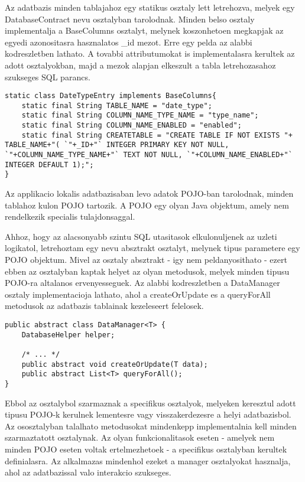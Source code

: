 Az adatbazis minden tablajahoz egy statikus osztaly lett letrehozva, melyek egy DatabaseContract nevu osztalyban tarolodnak.
Minden belso osztaly implementalja a BaseColumns osztalyt, melynek koszonhetoen megkapjak az egyedi azonositasra hasznalatos  \_id mezot.
Erre egy pelda az alabbi kodreszletben lathato.
A tovabbi attributumokat is implementalasra kerultek az adott osztalyokban, majd a mezok alapjan elkeszult a tabla letrehozasahoz szukseges SQL parancs.
\begin{lstlisting}
static class DateTypeEntry implements BaseColumns{
	static final String TABLE_NAME = "date_type";
	static final String COLUMN_NAME_TYPE_NAME = "type_name";
	static final String COLUMN_NAME_ENABLED = "enabled";
	static final String CREATETABLE = "CREATE TABLE IF NOT EXISTS "+ TABLE_NAME+"( `"+_ID+"` INTEGER PRIMARY KEY NOT NULL, `"+COLUMN_NAME_TYPE_NAME+"` TEXT NOT NULL, `"+COLUMN_NAME_ENABLED+"` INTEGER DEFAULT 1);";
}
\end{lstlisting}

Az applikacio lokalis adatbazisaban levo adatok POJO-ban tarolodnak, minden tablahoz kulon POJO tartozik.
A POJO egy olyan Java objektum, amely nem rendelkezik specialis tulajdonsaggal.

Ahhoz, hogy az alacsonyabb szintu SQL utasitasok elkulonuljenek az uzleti logikatol, letrehoztam egy  nevu absztrakt osztalyt, melynek tipus parametere egy POJO objektum. 
Mivel az osztaly absztrakt - igy nem peldanyosithato - ezert ebben az osztalyban kaptak helyet az olyan metodusok, melyek minden tipusu POJO-ra altalanos ervenyesseguek. 
Az alabbi kodreszletben a DataManager osztaly implementacioja lathato, ahol a createOrUpdate es a queryForAll metodusok az adatbazis tablainak kezeleseert felelosek.
\begin{lstlisting}
public abstract class DataManager<T> {	
    DatabaseHelper helper;
	
	/* ... */
    public abstract void createOrUpdate(T data);
    public abstract List<T> queryForAll();
}
\end{lstlisting} 
Ebbol az osztalybol szarmaznak a specifikus osztalyok, melyeken keresztul adott tipusu POJO-k kerulnek lementesre vagy visszakerdezesre a helyi adatbazisbol.
Az ososztalyban talalhato metodusokat mindenkepp implementalnia kell minden szarmaztatott osztalynak. 
Az olyan funkcionalitasok eseten - amelyek nem minden POJO eseten voltak ertelmezhetoek - a specifikus osztalyban kerultek definialasra.
Az alkalmazas mindenhol ezeket a manager osztalyokat hasznalja, ahol az adatbazissal valo interakcio szukseges.

